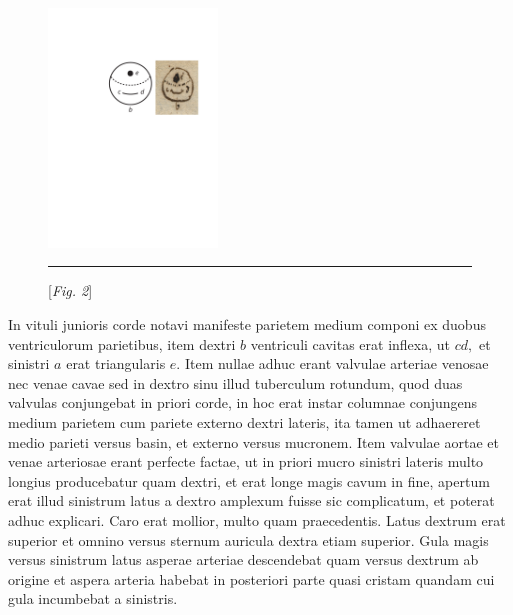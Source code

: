\count{}
\count{}
\count{}
\pstart
\begin{figure}                    
\includegraphics[trim = 0mm -3mm -5mm 0mm, clip,width=0.4\textwidth]{images/lh0040104b_003v1.pdf}\\
\rule[0mm]{19mm}{0mm}[\textit{Fig. 2}]
\end{figure}
In vituli junioris corde notavi manifeste parietem medium com\-poni ex duobus ventriculorum parietibus, item dextri $b$ ventriculi cavitas erat inflexa, ut $cd,$ et sinistri $a$ erat triangularis $e.$ Item nullae adhuc erant valvulae arteriae venosae nec venae cavae 
sed in dextro sinu illud tuberculum rotundum, quod duas valvulas conjungebat in priori corde, in hoc erat instar columnae conjungens medium parietem cum pariete externo dextri lateris, ita tamen ut adhaereret medio parieti versus basin, et externo versus mucronem. Item valvulae aortae et venae arteriosae erant perfecte factae, ut in priori mucro sinistri lateris multo longius producebatur quam dextri, et erat longe magis cavum in fine, apertum erat illud sinistrum latus a dextro amplexum fuisse sic complicatum, et poterat adhuc explicari. Caro erat mollior, multo quam praecedentis. Latus dextrum erat superior et omnino versus sternum
auricula dextra etiam superior. 
\pend 
\pstart  Gula magis versus sinistrum latus asperae arteriae\label{aspera} descendebat quam versus dextrum ab origine et aspera arteria habebat in posteriori parte quasi cristam quandam cui gula incumbebat a sinistris.
\pend%
\vspace{1.5em}
